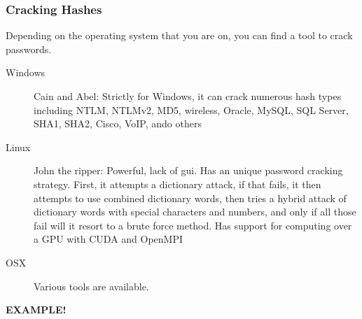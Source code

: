 \documentclass[a4paper, titlepage]{article}
\begin{document}
\subsubsection{Cracking Hashes}
Depending on the operating system that you are on, you can find a tool to crack passwords.

\begin{description}
    \item[Windows] Cain and Abel: Strictly for Windows, it can crack numerous hash types including NTLM, NTLMv2, MD5, wireless, Oracle, MySQL, SQL Server, SHA1, SHA2, Cisco, VoIP, ando others
    \item[Linux] John the ripper: Powerful, lack of gui. Has an unique password cracking strategy. First, it attempts a dictionary attack, if that fails, it then attempts to use combined dictionary words, then tries a hybrid attack of dictionary words with special characters and numbers, and only if all those fail will it resort to a brute force method. Has support for computing over a GPU with CUDA and OpenMPI
    \item[OSX] Various tools are available.
\end{description}

\textbf{EXAMPLE!}
\end{document}
